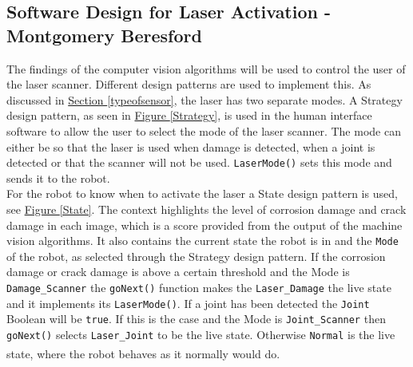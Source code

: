 \documentclass[11pt]{article}		%
\newcommand{\supercite}[1]{\textsuperscript{\cite{#1}}}		%
\newcommand{\figref}[1]{\hyperref[#1]{Figure \ref*{#1}}}    %
\newcommand{\sectref}[1]{\hyperref[#1]{Section \ref*{#1}}}     %
\begin{document}
	        
	        \subsection[Software Design for Laser Activation]{Software Design for Laser Activation - Montgomery Beresford}
	        
	        The findings of the computer vision algorithms will be used to control the user of the laser scanner. Different design patterns are used to implement this. As discussed in \sectref{typeofsensor}, the laser has two separate modes.
	        A Strategy design pattern, as seen in \figref{Strategy}, is used in the human interface software to allow the user to select the mode of the laser scanner. The mode can either be so that the laser is used when damage is detected, when a joint is detected or that the scanner will not be used. \verb|LaserMode()| sets this mode and sends it to the robot.	   \\
            \hspace*{3ex}For the robot to know when to activate the laser a State design pattern is used, see \figref{State}. The context highlights the level of corrosion damage and crack damage in each image, which is a score provided from the output of the machine vision algorithms. It also contains the current state the robot is in and the \verb|Mode| of the robot, as selected through the Strategy design pattern. If the corrosion damage or crack damage is above a certain threshold and the Mode is \verb|Damage_Scanner| the \verb|goNext()| function makes the \verb|Laser_Damage| the live state and it implements its \verb|LaserMode()|. If a joint has been detected the \verb|Joint| Boolean will be \verb|true|. If this is the case and the Mode is \verb|Joint_Scanner| then \verb|goNext()| selects \verb|Laser_Joint| to be the live state. Otherwise \verb|Normal| is the live state, where the robot behaves as it normally would do. \supercite{Design_Patterns}
	        
\end{document}

